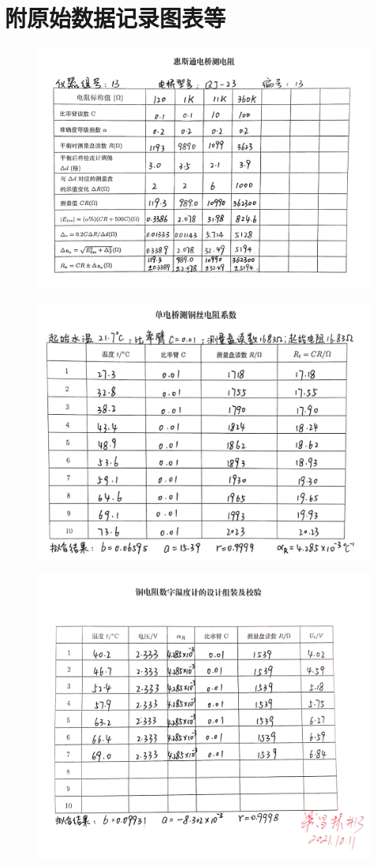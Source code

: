 \documentclass[UTF8]{ctexart}
\begin{document}
\section{附原始数据记录图表等}
\begin{figure}[ht]
    \centering
    \includegraphics[scale=0.15]{惠斯通电桥测电阻.jpg}
\end{figure}
\begin{figure}[ht]
    \centering
    \includegraphics[scale=0.225]{单电桥测铜丝电阻系数.jpg}
\end{figure}
\begin{figure}[ht]
    \centering
    \includegraphics[scale=0.16]{铜电阻数字温度计的设计组装及校验.jpg}

\end{figure}
\end{document}
